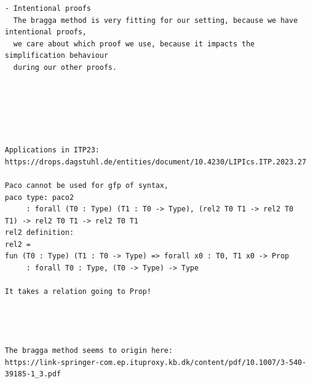 \begin{verbatim}
- Intentional proofs
  The bragga method is very fitting for our setting, because we have intentional proofs,
  we care about which proof we use, because it impacts the simplification behaviour 
  during our other proofs. 






Applications in ITP23: https://drops.dagstuhl.de/entities/document/10.4230/LIPIcs.ITP.2023.27

Paco cannot be used for gfp of syntax,
paco type: paco2
     : forall (T0 : Type) (T1 : T0 -> Type), (rel2 T0 T1 -> rel2 T0 T1) -> rel2 T0 T1 -> rel2 T0 T1
rel2 definition:
rel2 =
fun (T0 : Type) (T1 : T0 -> Type) => forall x0 : T0, T1 x0 -> Prop
     : forall T0 : Type, (T0 -> Type) -> Type

It takes a relation going to Prop!




The bragga method seems to origin here:
https://link-springer-com.ep.ituproxy.kb.dk/content/pdf/10.1007/3-540-39185-1_3.pdf


\end{verbatim}
